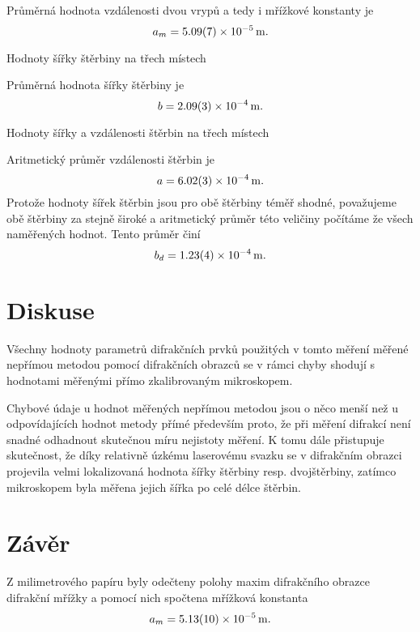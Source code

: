\documentclass{protokol}
\begin{document}
      Průměrná hodnota vzdálenosti dvou vrypů a tedy i mřížkové konstanty je $$ a_m = \SI{5.09 \pm 0.07 e-5}{m}.$$
      
      \begin{table}[H]
        \centering
        \setlength{\tabcolsep}{5pt}
        
        \caption{Hodnoty šířky štěrbiny na třech místech}
        \label{tab:sterbina_stredni}
      \end{table}

      Průměrná hodnota šířky štěrbiny je $$ b = \SI{2.09 \pm 0.03 e-4}{m}.$$
      
      \begin{table}[H]
        \centering
        \setlength{\tabcolsep}{10pt}
        
        \caption{Hodnoty šířky a vzdálenosti štěrbin na třech místech}
        \label{tab:dvojs_blizke}
      \end{table}

      Aritmetický průměr vzdálenosti štěrbin je 
      $$ a = \SI{6.02 \pm 0.03 e-4}{m}. $$
      Protože hodnoty šířek štěrbin jsou pro obě štěrbiny téměř shodné, považujeme obě štěrbiny za stejně široké a aritmetický průměr této veličiny počítáme že všech naměřených hodnot. Tento průměr činí 
      $$ b_d = \SI{1.23 \pm 0.04 e-4}{m}. $$


  \section*{Diskuse}

    Všechny hodnoty parametrů difrakčních prvků použitých v tomto měření měřené nepřímou metodou pomocí difrakčních obrazců se v rámci chyby shodují s hodnotami měřenými přímo zkalibrovaným mikroskopem. 
    
    Chybové údaje u hodnot měřených nepřímou metodou jsou o něco menší než u odpovídajících hodnot metody přímé především proto, že při měření difrakcí není snadné odhadnout skutečnou míru nejistoty měření. K tomu dále přistupuje skutečnost, že díky relativně úzkému laserovému svazku se v difrakčním obrazci projevila velmi lokalizovaná hodnota šířky štěrbiny resp. dvojštěrbiny, zatímco mikroskopem byla měřena jejich šířka po celé délce štěrbin.

  \section*{Závěr}

    Z milimetrového papíru byly odečteny polohy maxim difrakčního obrazce difrakční mřížky a pomocí nich spočtena mřížková konstanta 
    $$ a_m = \SI{5.13 \pm 0.10 e-5}{m}. $$
    
\end{document}
